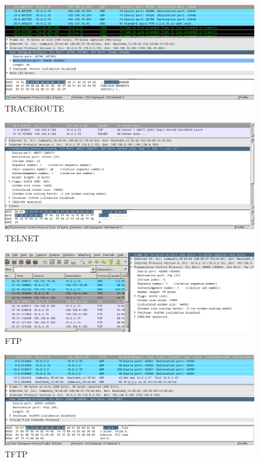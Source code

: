 \documentclass[a4paper]{report}
\begin{document}
\begin{figure}[H]
    \centering 
    \includegraphics[width=\textwidth]{images/tracerout.png}  
    \caption{TRACEROUTE}
    \label{fig:tracerout}
\end{figure}

\begin{figure}[H]
    \centering 
    \includegraphics[width=\textwidth]{images/telnet.png}  
    \caption{TELNET}
    \label{fig:telnet}
\end{figure}

\begin{figure}[H]
    \centering 
    \includegraphics[width=\textwidth]{images/ftp.png}  
    \caption{FTP}
    \label{fig:ftp}
\end{figure}

\begin{figure}[H]
    \centering 
    \includegraphics[width=\textwidth]{images/tftp.png}  
    \caption{TFTP}
    \label{fig:tftp}
\end{figure}
\end{document}
